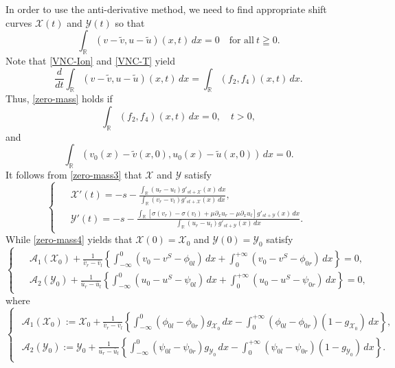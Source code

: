 \documentclass[12pt,reqno]{amsart}
\numberwithin{equation}{section}
\def\p{\partial}
\def\R{\mathbb{R}}
\def\avl{\overline{v}_l}
\def\avr{\overline{v}_r}
\def\aul{\overline{u}_l}
\def\aur{\overline{u}_r}
\def\vt{\tilde{v}}
\def\ut{\tilde{u}}
\def\X{\mathcal{X}}
\def\Y{\mathcal{Y}}
\begin{document}
In order to use the anti-derivative method, we need to find appropriate shift curves $\X(t)$ and $\Y(t)$ so that  
\begin{equation}\label{zero-mass}
	\int_{\R}(v-\vt,u-\ut)(x,t)  \,dx=0 \quad \text{for all}~t\geqq 0. 
\end{equation}
Note that \eqref{VNC-Ion} and \eqref{VNC-T} yield  
\begin{equation}\label{zero-mass2}
	\frac{d}{dt}\int_{\R}(v-\vt,u-\ut) (x,t) \,dx=\int_{\R}(f_2,f_4)(x,t) \,dx. 
\end{equation}
Thus, \eqref{zero-mass} holds if
\begin{equation}\label{zero-mass3}
	\int_{\R} (f_2,f_4)(x,t) \,dx=0, \quad t>0, 
\end{equation}
and
\begin{equation}\label{zero-mass4}
	\int_{\R}(v_0(x)-\vt(x,0),u_0(x)-\ut(x,0))  \,dx =0.
\end{equation}
It follows from \eqref{zero-mass3} that $\X$ and $\Y$ satisfy
\begin{equation}\label{XY}
	\begin{cases}
		\begin{aligned}
			&\X'(t)=-s-\frac{\int_{\R}(u_r-u_l)g'_{st+\X}(x)  \,dx }{\int_{\R}(v_r-v_l)g'_{st+\X}(x)  \,dx },\\
			&\Y'(t)=-s-\frac{\int_{\R}[\sigma(v_r)-\sigma(v_l)+\mu\p_x u_r-\mu\p_x u_l]g'_{st+\Y}(x)\,dx }{\int_{\R}(u_r-u_l)g'_{st+\Y}(x) \,dx}.
		\end{aligned}
	\end{cases}
\end{equation}
While \eqref{zero-mass4} yields that $\X(0)=\X_0$ and $\Y(0)=\Y_0$ satisfy
\begin{equation}\label{XY1}
	\begin{cases}
		\begin{aligned}
				&\mathcal{A}_1(\X_0)+ \frac{1}{\avr-\avl}\left\{\int_{-\infty}^{0}(v_0-v^S-\phi_{0l})  \,dx +\int_{0}^{+\infty}(v_0-v^S-\phi_{0r})  \,dx \right\}=0,\\
				&	\mathcal{A}_2(\Y_0)+ \frac{1}{\aur-\aul}\left\{\int_{-\infty}^{0}(u_0-u^S-\psi_{0l})  \,dx +\int_{0}^{+\infty}(u_0-u^S-\psi_{0r})  \,dx \right\}=0,
		\end{aligned}
	\end{cases}
\end{equation}
where
\begin{equation}\label{XY2}
	\begin{cases}
		\begin{aligned}
			\mathcal{A} _1(\X_0):=\X_0+\frac{1}{\avr-\avl}\left\{\int_{-\infty}^{0}(\phi_{0l}-\phi_{0r})g_{\X_0}  \,dx-\int_{0}^{+\infty}(\phi_{0l}-\phi_{0r})(1-g_{\X_0})  \,dx\right\},\\
			\mathcal{A} _2(\Y_0):=\Y_0+\frac{1}{\aur-\aul}\left\{\int_{-\infty}^{0}(\psi_{0l}-\psi_{0r})g_{\Y_0}  \,dx-\int_{0}^{+\infty}(\psi_{0l}-\psi_{0r})(1-g_{\Y_0})  \,dx\right\}.
		\end{aligned}
	\end{cases}
\end{equation}
\end{document}
